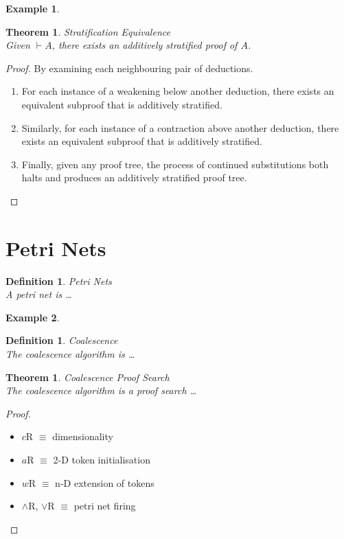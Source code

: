 \documentclass[twocolumn]{article}
\theoremstyle{indented}
\newtheorem{theorem}[sec-ctr]{Theorem}
\newtheorem{definition}[sec-ctr]{Definition}
\newtheorem*{example*}{Example}
\begin{document}
        \begin{example*}
        \end{example*}


        \begin{theorem}{Stratification Equivalence\\}
            Given $\vdash A$, there exists an additively stratified proof of $A$.
        \end{theorem}
        \begin{proof}
            By examining each neighbouring pair of deductions.
            \begin{enumerate}
                \item For each instance of a weakening below another deduction, there exists an equivalent subproof that is additively stratified.
                \item Similarly, for each instance of a contraction above another deduction, there exists an equivalent subproof that is additively stratified.
                \item Finally, given any proof tree, the process of continued substitutions both halts and produces an additively stratified proof tree.
            \end{enumerate}
        \end{proof}



    \section{Petri Nets}
        
        \begin{definition}{Petri Nets\\}
            A petri net is \ldots
        \end{definition}

        \begin{example*}
        \end{example*}

        
        \begin{definition}{Coalescence\\}
            The coalescence algorithm is \ldots
        \end{definition}


        \begin{theorem}{Coalescence Proof Search\\}
            The coalescence algorithm is a proof search \ldots
        \end{theorem}

        \begin{proof}
            \begin{itemize}
                \item $c$R $\equiv$ dimensionality
                \item $a$R $\equiv$ 2-D token initialisation
                \item $w$R $\equiv$ n-D extension of tokens
                \item $\wedge$R, $\vee$R $\equiv$ petri net firing
            \end{itemize}
        \end{proof}
        
\end{document}

